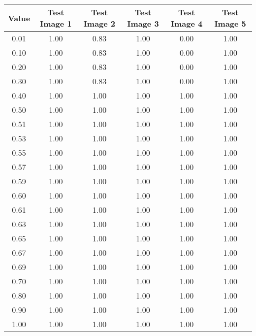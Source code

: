 \begin{tabular}{|c|c|c|c|c|c|}
\hline
\textbf{Value}&\textbf{Test Image 1}&\textbf{Test Image 2}&\textbf{Test Image 3}&\textbf{Test Image 4}&\textbf{Test Image 5}\\\hline
0.01&1.00&0.83&1.00&0.00&1.00\\\hline
0.10&1.00&0.83&1.00&0.00&1.00\\\hline
0.20&1.00&0.83&1.00&0.00&1.00\\\hline
0.30&1.00&0.83&1.00&0.00&1.00\\\hline
0.40&1.00&1.00&1.00&1.00&1.00\\\hline
0.50&1.00&1.00&1.00&1.00&1.00\\\hline
0.51&1.00&1.00&1.00&1.00&1.00\\\hline
0.53&1.00&1.00&1.00&1.00&1.00\\\hline
0.55&1.00&1.00&1.00&1.00&1.00\\\hline
0.57&1.00&1.00&1.00&1.00&1.00\\\hline
0.59&1.00&1.00&1.00&1.00&1.00\\\hline
0.60&1.00&1.00&1.00&1.00&1.00\\\hline
0.61&1.00&1.00&1.00&1.00&1.00\\\hline
0.63&1.00&1.00&1.00&1.00&1.00\\\hline
0.65&1.00&1.00&1.00&1.00&1.00\\\hline
0.67&1.00&1.00&1.00&1.00&1.00\\\hline
0.69&1.00&1.00&1.00&1.00&1.00\\\hline
0.70&1.00&1.00&1.00&1.00&1.00\\\hline
0.80&1.00&1.00&1.00&1.00&1.00\\\hline
0.90&1.00&1.00&1.00&1.00&1.00\\\hline
1.00&1.00&1.00&1.00&1.00&1.00\\\hline
\end{tabular}

